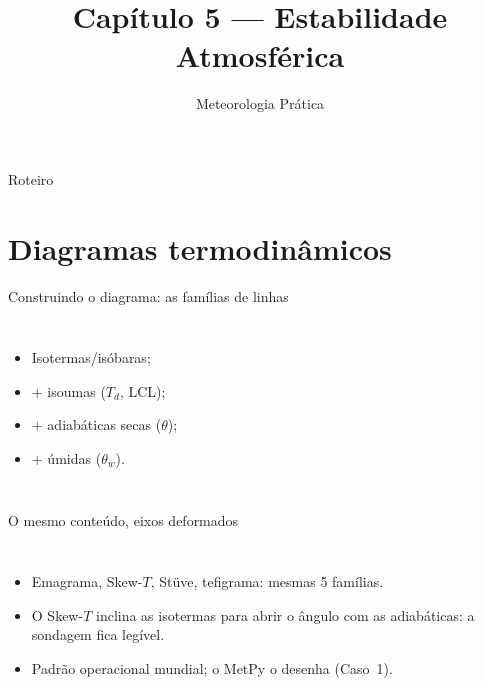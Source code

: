 \documentclass[aspectratio=169,11pt]{beamer}
\title[Cap. 5 --- Estabilidade]{Capítulo 5 --- Estabilidade Atmosférica}
\subtitle{Meteorologia Prática}
\author{}
\date{}
\begin{document}
\begin{frame}
  \titlepage
  \vfill
  \atribuicao
\end{frame}

\begin{frame}{Roteiro}
  \tableofcontents
\end{frame}

\section{Diagramas termodinâmicos}

\begin{frame}{Construindo o diagrama: as famílias de linhas}
  \begin{columns}
    \begin{itemize}
      \item Isotermas/isóbaras;
      \item $+$ isoumas ($T_d$, LCL);
      \item $+$ adiabáticas secas ($\theta$);
      \item $+$ úmidas ($\theta_w$).
    \end{itemize}
  \end{columns}
\end{frame}

\begin{frame}{O mesmo conteúdo, eixos deformados}
  \begin{columns}
    \begin{itemize}
      \item Emagrama, Skew-$T$, Stüve, tefigrama: mesmas 5 famílias.
      \item O Skew-$T$ \alert{inclina as isotermas} para abrir o ângulo
            com as adiabáticas: a sondagem fica legível.
      \item Padrão operacional mundial; o MetPy o desenha (Caso~1).
    \end{itemize}
  \end{columns}
\end{frame}
\end{document}
